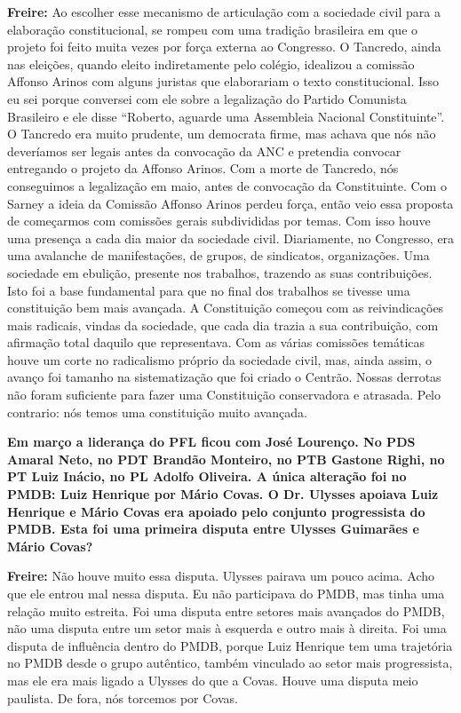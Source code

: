 \textbf{Freire:} Ao escolher esse mecanismo de articulação com a
sociedade civil para a elaboração constitucional, se rompeu com uma
tradição brasileira em que o projeto foi feito muita vezes por força
externa ao Congresso. O Tancredo, ainda nas eleições, quando eleito
indiretamente pelo colégio, idealizou a comissão Affonso Arinos com
alguns juristas que elaborariam o texto constitucional. Isso eu sei
porque conversei com ele sobre a legalização do Partido Comunista
Brasileiro e ele disse ``Roberto, aguarde uma Assembleia Nacional
Constituinte''. O Tancredo era muito prudente, um democrata firme, mas
achava que nós não deveríamos ser legais antes da convocação da ANC e
pretendia convocar entregando o projeto da Affonso Arinos. Com a morte
de Tancredo, nós conseguimos a legalização em maio, antes de convocação
da Constituinte. Com o Sarney a ideia da Comissão Affonso Arinos perdeu
força, então veio essa proposta de começarmos com comissões gerais
subdivididas por temas. Com isso houve uma presença a cada dia maior da
sociedade civil. Diariamente, no Congresso, era uma avalanche de
manifestações, de grupos, de sindicatos, organizações. Uma sociedade em
ebulição, presente nos trabalhos, trazendo as suas contribuições. Isto
foi a base fundamental para que no final dos trabalhos se tivesse uma
constituição bem mais avançada. A Constituição começou com as
reivindicações mais radicais, vindas da sociedade, que cada dia trazia a
sua contribuição, com afirmação total daquilo que representava. Com as
várias comissões temáticas houve um corte no radicalismo próprio da
sociedade civil, mas, ainda assim, o avanço foi tamanho na
sistematização que foi criado o Centrão. Nossas derrotas não foram
suficiente para fazer uma Constituição conservadora e atrasada. Pelo
contrario: nós temos uma constituição muito avançada.

\textbf{Em março a liderança do PFL ficou com José Lourenço. No PDS
Amaral Neto, no PDT Brandão Monteiro, no PTB Gastone Righi, no PT Luiz
Inácio, no PL Adolfo Oliveira. A única alteração foi no PMDB: Luiz
Henrique por Mário Covas. O Dr. Ulysses apoiava Luiz Henrique e Mário
Covas era apoiado pelo conjunto progressista do PMDB. Esta foi uma
primeira disputa entre Ulysses Guimarães e Mário Covas?}

\textbf{Freire:} Não houve muito essa disputa. Ulysses pairava um pouco
acima. Acho que ele entrou mal nessa disputa. Eu não participava do
PMDB, mas tinha uma relação muito estreita. Foi uma disputa entre
setores mais avançados do PMDB, não uma disputa entre um setor mais à
esquerda e outro mais à direita. Foi uma disputa de influência dentro do
PMDB, porque Luiz Henrique tem uma trajetória no PMDB desde o grupo
autêntico, também vinculado ao setor mais progressista, mas ele era mais
ligado a Ulysses do que a Covas. Houve uma disputa meio paulista. De
fora, nós torcemos por Covas.

